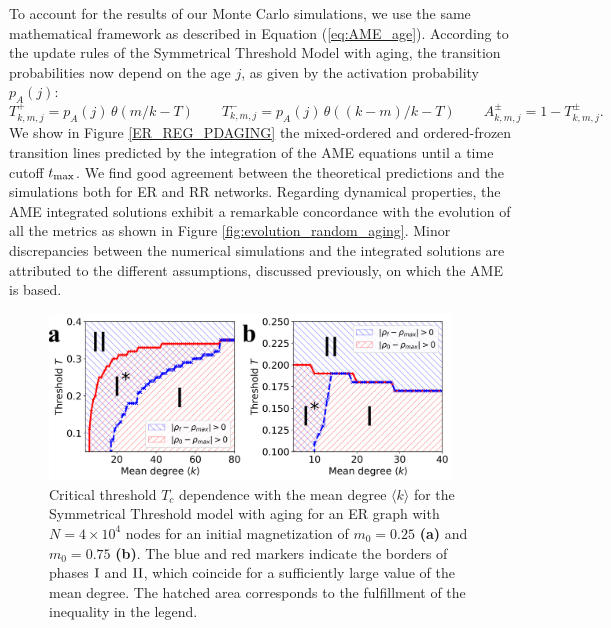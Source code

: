 To account for the results of our Monte Carlo simulations, we use the same mathematical framework as described in Equation (\ref{eq:AME_age}). According to the update rules of the Symmetrical Threshold Model with aging, the transition probabilities now depend on the age $j$, as given by the activation probability  $p_A (j)$:
\begin{equation}
    T^{+}_{k,m,j} = p_A(j) \, \theta(m/k - T) \quad \quad T^{-}_{k,m,j} = p_A(j) \, \theta((k-m)/k - T) \quad \quad A^{\pm}_{k,m,j} = 1 - T^{\pm}_{k,m,j}.
\end{equation}
We show in Figure \ref{ER_REG_PDAGING} the mixed-ordered and ordered-frozen transition lines predicted by the integration of the AME equations until a time cutoff $t_{\rm max}$. We find good agreement between the theoretical predictions and the simulations both for ER and RR networks. Regarding dynamical properties, the AME integrated solutions exhibit a remarkable concordance with the evolution of all the metrics as shown in Figure \ref{fig:evolution_random_aging}. Minor discrepancies between the numerical simulations and the integrated solutions are attributed to the different assumptions, discussed previously, on which the AME is based.  
\begin{figure}
        \centering \captionsetup{font=sf}
        \includegraphics[width=0.95\textwidth]{Figs/Aging_STM/FIG8.pdf}
        \caption[Phase ${\rm I}^{*}$ dependence with the network mean degree]{\label{fig:PD_Z} Critical threshold $T_c$ dependence with the mean degree $\langle k \rangle$ for the Symmetrical Threshold model with aging for an ER graph with $N = 4 \times 10^4$ nodes for an initial magnetization of $m_0 = 0.25$ \textbf{(a)} and $m_0 = 0.75$ \textbf{(b)}. The blue and red markers indicate the borders of phases ${\rm I}$ and ${\rm II}$, which coincide for a sufficiently large value of the mean degree. The hatched area corresponds to the fulfillment of the inequality in the legend.}
\end{figure}

